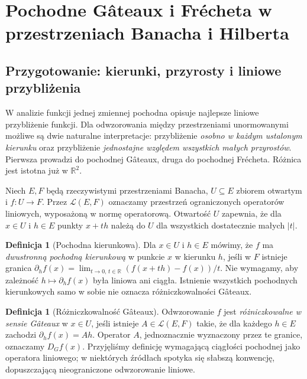 \documentclass[11pt,a4paper]{article}
\numberwithin{equation}{section}
\theoremstyle{plain}
\theoremstyle{definition}
\newtheorem{definicja}[twierdzenie]{Definicja}
\theoremstyle{remark}
\newcommand{\R}{\mathbb R}
\begin{document}
\setcounter{section}{13}
\section{Pochodne Gâteaux i Frécheta w przestrzeniach Banacha i Hilberta}
\label{sec:gateaux-frechet14}

\subsection{Przygotowanie: kierunki, przyrosty i liniowe przybliżenia}

W analizie funkcji jednej zmiennej pochodna opisuje najlepsze liniowe przybliżenie funkcji. Dla odwzorowania między przestrzeniami unormowanymi możliwe są dwie naturalne interpretacje: przybliżenie \emph{osobno w każdym ustalonym kierunku} oraz przybliżenie \emph{jednostajne względem wszystkich małych przyrostów}. Pierwsza prowadzi do pochodnej Gâteaux, druga do pochodnej Frécheta. Różnica jest istotna już w $\R^2$.

Niech $E,F$ będą rzeczywistymi przestrzeniami Banacha, $U\subseteq E$ zbiorem otwartym i $f:U\to F$. Przez $\mathcal L(E,F)$ oznaczamy przestrzeń ograniczonych operatorów liniowych, wyposażoną w normę operatorową. Otwartość $U$ zapewnia, że dla $x\in U$ i $h\in E$ punkty $x+th$ należą do $U$ dla wszystkich dostatecznie małych $|t|$.

\begin{definicja}[Pochodna kierunkowa]
\label{def:directional14}
Dla $x\in U$ i $h\in E$ mówimy, że $f$ ma \emph{dwustronną pochodną kierunkową} w punkcie $x$ w kierunku $h$, jeśli w $F$ istnieje granica
$\partial_h f(x)=\lim_{t\to0,\,t\in\R}(f(x+th)-f(x))/t$.
Nie wymagamy, aby zależność $h\mapsto\partial_h f(x)$ była liniowa ani ciągła. Istnienie wszystkich pochodnych kierunkowych samo w sobie nie oznacza różniczkowalności Gâteaux.
\end{definicja}

\begin{definicja}[Różniczkowalność Gâteaux]
\label{def:gateaux14}
Odwzorowanie $f$ jest \emph{różniczkowalne w sensie Gâteaux} w $x\in U$, jeśli istnieje $A\in\mathcal L(E,F)$ takie, że dla każdego $h\in E$ zachodzi $\partial_h f(x)=Ah$. Operator $A$, jednoznacznie wyznaczony przez te granice, oznaczamy $D_Gf(x)$. Przyjęliśmy definicję wymagającą ciągłości pochodnej jako operatora liniowego; w niektórych źródłach spotyka się słabszą konwencję, dopuszczającą nieograniczone odwzorowanie liniowe.
\end{definicja}
\end{document}
